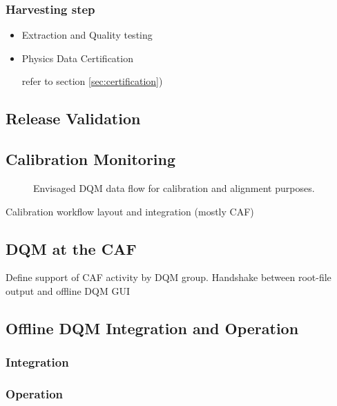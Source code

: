 \subsubsection{Harvesting step}

\begin{itemize}
\item{Extraction and Quality testing}

\item{Physics Data Certification} 

refer to section \ref{sec:certification})


\end{itemize}

\subsection{Release Validation}

\subsection{Calibration Monitoring}

\begin{figure}[!htbp]
\begin{center}
\caption{Envisaged DQM data flow for calibration and alignment purposes.}
\end{center}
\label{fig:dqmalca}
\end{figure}

Calibration workflow layout and integration (mostly CAF)

\subsection{DQM at the CAF}
\label{sec:caf}

Define support of CAF activity by DQM group.
Handshake between root-file output and offline DQM GUI

\subsection{Offline DQM Integration and Operation}

\subsubsection*{Integration}

\subsubsection*{Operation}
